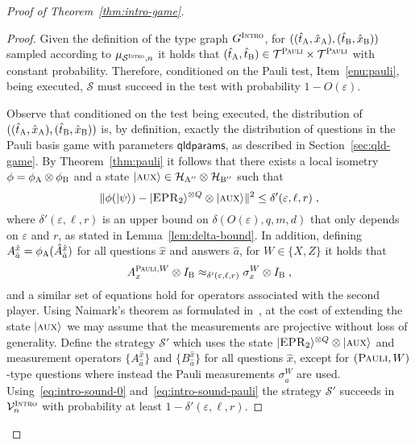 \documentclass[11pt]{article}
\theoremstyle{definition}
\newcommand{\ket}[1]{|#1\rangle}
\newcommand{\Id}{\ensuremath{I}}
\newcommand{\mH}{\ensuremath{\mathcal{H}}}
\newcommand{\eps}{\varepsilon}
\newcommand{\sampler}{\mathcal{S}}
\newcommand{\verifier}{\mathcal{V}}
\newcommand{\strategy}{\mathscr{S}}
\newcommand{\type}{\mathcal{T}}
\newcommand{\gamestyle}[1]{\ensuremath{\textsc{#1}}\xspace}
\newcommand{\pauli}{\gamestyle{Pauli}}
\newcommand{\intro}{\gamestyle{Intro}}
\newcommand{\labelstyle}[1]{\ensuremath{\textsc{#1}}\xspace}
\newcommand{\EPR}{\labelstyle{EPR}}
\newcommand{\aux}{\labelstyle{aux}}
\newcommand{\alice}{\labelstyle{A}}
\newcommand{\bob}{\labelstyle{B}}
\newcommand{\typestyle}[1]{\ensuremath{\textsc{#1}}\xspace}
\newcommand{\Pauli}{\typestyle{Pauli}}
\newcommand{\qldparams}{\mathsf{qldparams}}
\begin{document}
\begin{proof}[Proof of Theorem~\ref{thm:intro-game}]
  \begin{proof}
    Given the definition of the type graph $G^\intro$, for
    $((\hat{t}_\alice,\hat{x}_\alice),(\hat{t}_\bob,\hat{x}_\bob))$ sampled
    according to $\mu_{\sampler^\intro,n}$ it holds that
    $(\hat{t}_\alice,\hat{t}_\bob) \in \type^\pauli \times \type^\pauli$ with
    constant probability.
    Therefore, conditioned on the Pauli test, Item~\ref{enu:pauli}, being
    executed, $\strategy$ must succeed in the test with probability $1-O(\eps)$.

    Observe that conditioned on the test being executed, the distribution of
    $((\hat{t}_\alice,\hat{x}_\alice),(\hat{t}_\bob,\hat{x}_\bob))$ is, by
    definition, exactly the distribution of questions in the Pauli basis game
    with parameters $\qldparams$, as described in Section~\ref{sec:qld-game}.
    By Theorem~\ref{thm:pauli} it follows that there exists a local isometry
    $\phi = \phi_\alice \otimes \phi_\bob$ and a state $\ket{\aux}\in
    \mH_{\alice''}\otimes \mH_{\bob''}$ such that
    \begin{equation}\label{eq:intro-sound-0}
      \Vert \phi (\ket{\psi}) - \ket{\EPR_2}^{\otimes Q} \otimes
      \ket{\aux} \Vert^2 \leq \delta'(\eps,\ell,r)\;,
    \end{equation}
    where $\delta'(\eps,\ell,r)$ is an upper bound on $\delta(O(\eps),q,m,d)$
    that only depends on $\eps$ and $r$, as stated in
    Lemma~\ref{lem:delta-bound}.
    In addition, defining $A^{\hat{x}}_{\hat{a}} = \phi_\alice(
    \hat{A}^{\hat{x}}_{\hat{a}} )$ for all questions $\hat{x}$ and answers
    $\hat{a}$, for $W \in \{X, Z\}$ it holds that
    \begin{equation}
      \label{eq:intro-sound-pauli}
      A^{\Pauli,W}_x \otimes \Id_\bob \approx_{\delta'(\eps,\ell,r)}
      \sigma^W_x \otimes \Id_\bob\;,
    \end{equation}
    and a similar set of equations hold for operators associated with the second
    player.
    Using Naimark's theorem as formulated in~\cite[Theorem 4.2]{NW19}, at the
    cost of extending the state $\ket{\aux}$ we may assume that the measurements
    are projective without loss of generality.
    Define the strategy $\strategy'$ which uses the state $\ket{\EPR_2}^{\otimes
      Q} \otimes \ket{\aux}$ and measurement operators $\{ A^{\hat{x}}_{\hat{a}}
    \}$ and $\{ B^{\hat{x}}_{\hat{a}} \}$ for all questions $\hat{x}$, except
    for $(\Pauli,W)$-type questions where instead the Pauli measurements
    $\sigma^W_{\hat{a}}$ are used.
    Using~\eqref{eq:intro-sound-0} and~\eqref{eq:intro-sound-pauli} the strategy
    $\strategy'$ succeeds in $\verifier^\intro_n$ with probability at least
    $1-\delta'(\eps,\ell,r)$.
	

\end{proof}
\end{proof}
\end{document}
